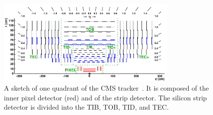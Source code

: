 \begin{figure}[bp]
 \centering
 \includegraphics[width=0.79\textwidth]{figures/general/tracker.pdf}
 \caption{A sketch of one quadrant of the CMS tracker~\cite{TrackerPDFPic}. It is composed of the inner pixel detector (red) and of the strip detector. The silicon strip detector is divided into the TIB, TOB, TID, and TEC.}
 \label{fig:tracker}
\end{figure}

